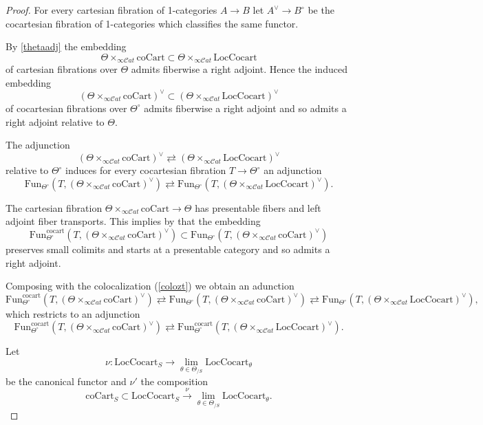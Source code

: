 \documentclass[10pt,oneside]{article}
\numberwithin{equation}{section} %
\numberwithin{figure}{section} %
\theoremstyle{plain}
\theoremstyle{definition}
\newcommand{\Fun}{\mathrm{Fun}}
\newcommand{\cocart}{{\mathrm{cocart}}}
\newcommand{\scat}{\mathcal{C}\mathit{at}}
\begin{document}
\begin{proof}

For every cartesian fibration of 1-categories $A \to B$ let
$A^\vee \to B^\circ$ be the cocartesian fibration of 1-categories which classifies the same functor.

By \cref{thetaadj} the embedding $$\Theta \times_{\infty\scat}  \mathrm{coCart} \subset \Theta \times_{\infty\scat}  \mathrm{Loc}\mathrm{Cocart} $$ of cartesian fibrations over $\Theta $
admits fiberwise a right adjoint.
Hence the induced embedding $$(\Theta \times_{\infty\scat}  \mathrm{coCart})^\vee \subset (\Theta \times_{\infty\scat}  \mathrm{Loc}\mathrm{Cocart})^\vee $$ of cocartesian fibrations over $\Theta^\circ $
admits fiberwise a right adjoint and so admits a right adjoint relative to $\Theta. $

The adjunction $$ (\Theta \times_{\infty\scat} \mathrm{coCart})^\vee \rightleftarrows (\Theta \times_{\infty\scat} \mathrm{Loc}\mathrm{Cocart})^\vee $$
relative to $\Theta^\circ$ induces for every cocartesian fibration $T \to \Theta^\circ $ an adjunction
$$ \Fun_{\Theta^\circ}(T, (\Theta \times_{\infty\scat} \mathrm{coCart})^\vee) \rightleftarrows \Fun_{\Theta^\circ}(T, (\Theta \times_{\infty\scat} \mathrm{Loc}\mathrm{Cocart})^\vee).$$

The cartesian fibration $\Theta \times_{\infty\scat} \mathrm{coCart} \to \Theta$ has presentable fibers and left adjoint fiber transports. This implies by \cite[Theorem 10.3.]{articles} that the embedding \begin{equation}\label{colozt}
\Fun^\cocart_{\Theta^\circ}(T, (\Theta \times_{\infty\scat} \mathrm{coCart})^\vee) \subset \Fun_{\Theta^\circ}(T, (\Theta \times_{\infty\scat} \mathrm{coCart})^\vee) \end{equation} 
preserves small colimits and starts at a presentable category and so 
admits a right adjoint.

Composing with the colocalization (\ref{colozt})
we obtain an adunction 
$$ \Fun^\cocart_{\Theta^\circ}(T, (\Theta \times_{\infty\scat} \mathrm{coCart})^\vee) \rightleftarrows \Fun_{\Theta^\circ}(T, (\Theta \times_{\infty\scat} \mathrm{coCart})^\vee) \rightleftarrows \Fun_{\Theta^\circ}(T, (\Theta \times_{\infty\scat} \mathrm{Loc}\mathrm{Cocart})^\vee),$$
which restricts to an adjunction
$$ \Fun^\cocart_{\Theta^\circ}(T, (\Theta \times_{\infty\scat} \mathrm{coCart})^\vee) \rightleftarrows \Fun^\cocart_{\Theta^\circ}(T, (\Theta \times_{\infty\scat} \mathrm{Loc}\mathrm{Cocart})^\vee).$$

Let $$ \nu: \mathrm{Loc} \mathrm{Cocart}_S \to \lim_{\theta \in \Theta_{/S}} \mathrm{Loc} \mathrm{Cocart}_\theta $$
be the canonical functor and $\nu'$ the composition $$ \mathrm{coCart}_S \subset \mathrm{Loc} \mathrm{Cocart}_S \xrightarrow{\nu} \lim_{\theta \in \Theta_{/S}} \mathrm{Loc} \mathrm{Cocart}_\theta.$$


\end{proof}
\end{document}
